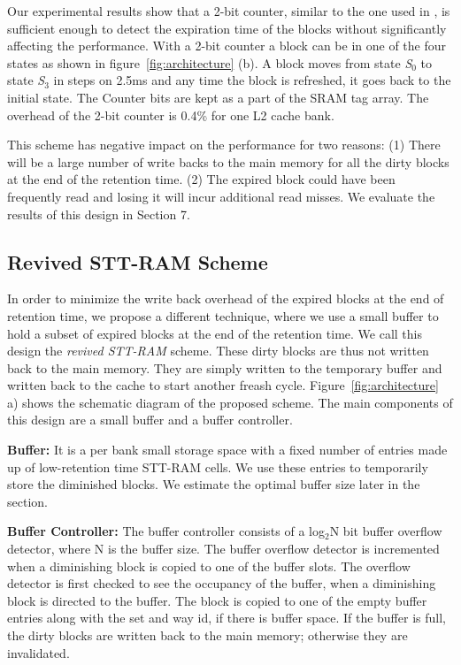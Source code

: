 Our experimental results show that a 2-bit counter, similar to the one used in \cite{cache-decay-2001},
is sufficient enough to detect the expiration time of the blocks without significantly affecting the performance.
With a 2-bit counter a block can be in one of the four states as shown in figure~\ref{fig:architecture} (b).
A block moves from state {\it S$_0$} to state {\it S$_3$} in steps on 2.5ms and any time the block is refreshed, it
goes back to the initial state.  The Counter bits are kept as a part of the SRAM tag array.
The overhead of the 2-bit counter is 0.4\% for one L2 cache bank.

This scheme has negative impact on the performance for two reasons: (1) There will be  a large number of write
backs to the main memory for all the dirty blocks at the end of the retention time.
(2) The expired block could have been frequently read and losing it will incur additional read misses.
We evaluate the results of this design in Section 7.


\subsection{{Revived STT-RAM Scheme}}
In order to minimize the write back overhead of the expired blocks at the end of retention time, we propose
a different technique, where we use a small buffer to hold a subset of expired blocks at the end of the retention
time. We call this design the {\it revived STT-RAM} scheme. These dirty blocks are thus not written back to the main memory. They are simply written to the temporary buffer and
written back to the cache to start another freash cycle.
Figure~\ref{fig:architecture} a) shows the schematic diagram of the proposed scheme.
The main components of this design are a small buffer and a buffer controller.

\noindent\textbf{Buffer:}
It is a per bank small storage space with a fixed number of entries made up of low-retention time STT-RAM cells.
We use these entries to temporarily store the diminished blocks. We estimate the optimal buffer size later in
the section.

\noindent\textbf{Buffer Controller:}
The buffer controller consists of a log$_2$N bit buffer overflow detector, where N is the buffer size.
The buffer overflow detector is incremented when a diminishing block
is copied to one of the buffer slots. The overflow detector is first checked to see the occupancy of the buffer,
when a diminishing block is directed to the buffer.
The block is copied to one of the empty buffer entries along with the set and way id, if there is
buffer space.
If the buffer is full, the dirty blocks are written back to the main memory; otherwise they are  invalidated.

